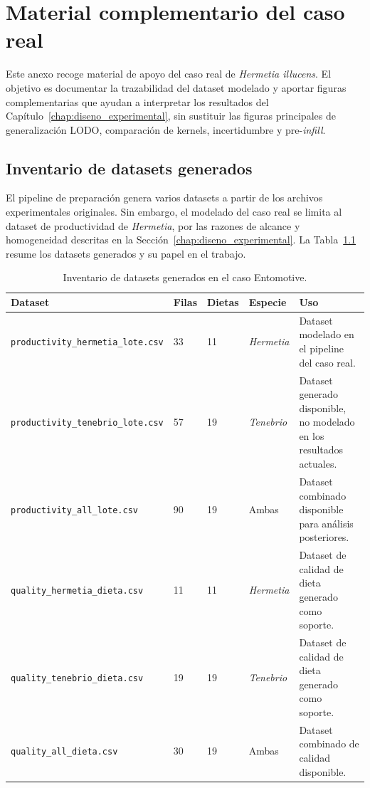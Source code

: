 \chapter{Material complementario del caso real}
\label{app:caso_real_complementario}

Este anexo recoge material de apoyo del caso real de \textit{Hermetia illucens}. El objetivo es documentar la trazabilidad del dataset modelado y aportar figuras complementarias que ayudan a interpretar los resultados del Capítulo~\ref{chap:diseno_experimental}, sin sustituir las figuras principales de generalización LODO, comparación de kernels, incertidumbre y pre-\emph{infill}.

\section{Inventario de datasets generados}
\label{app:inventario_datasets_entomotive}

El pipeline de preparación genera varios datasets a partir de los archivos experimentales originales. Sin embargo, el modelado del caso real se limita al dataset de productividad de \textit{Hermetia}, por las razones de alcance y homogeneidad descritas en la Sección~\ref{chap:diseno_experimental}. La Tabla~\ref{tab:app_inventory_entomotive} resume los datasets generados y su papel en el trabajo.

\begin{table}[htbp]
\centering
\small
\caption[Inventario de datasets Entomotive]{Inventario de datasets generados en el caso Entomotive.}
\label{tab:app_inventory_entomotive}
\renewcommand{\arraystretch}{1.15}
\begin{tabularx}{\textwidth}{@{}p{5.3cm} p{1.4cm} p{1.7cm} p{2cm} X@{}}
\toprule
\textbf{Dataset} & \textbf{Filas} & \textbf{Dietas} & \textbf{Especie} & \textbf{Uso} \\
\midrule
\texttt{productivity\_hermetia\_lote.csv} & 33 & 11 & \textit{Hermetia} & Dataset modelado en el pipeline del caso real. \\
\texttt{productivity\_tenebrio\_lote.csv} & 57 & 19 & \textit{Tenebrio} & Dataset generado disponible, no modelado en los resultados actuales. \\
\texttt{productivity\_all\_lote.csv} & 90 & 19 & Ambas & Dataset combinado disponible para análisis posteriores. \\
\texttt{quality\_hermetia\_dieta.csv} & 11 & 11 & \textit{Hermetia} & Dataset de calidad de dieta generado como soporte. \\
\texttt{quality\_tenebrio\_dieta.csv} & 19 & 19 & \textit{Tenebrio} & Dataset de calidad de dieta generado como soporte. \\
\texttt{quality\_all\_dieta.csv} & 30 & 19 & Ambas & Dataset combinado de calidad disponible. \\
\bottomrule
\end{tabularx}
\end{table}
\FloatBarrier

